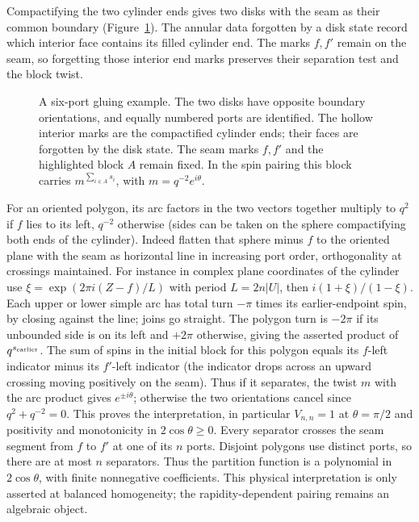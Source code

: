Compactifying the two cylinder ends gives two disks with the seam
as their common boundary (Figure~\ref{fig:disk-gluing}). The annular data
forgotten by a disk state record which interior face contains its filled
cylinder end. The marks \(f,f'\) remain on the seam, so forgetting those
interior end marks preserves their separation test and the block twist.
\begin{figure}[htbp]
\centering

\caption{A six-port gluing example. The two disks have opposite boundary
orientations, and equally numbered ports are identified. The hollow
interior marks are the compactified cylinder ends; their faces are
forgotten by the disk state. The seam marks $f,f'$ and the highlighted
block $A$ remain fixed. In the spin pairing this block carries
$m^{\sum_{i\in A}s_i}$, with $m=q^{-2}e^{i\theta}$.}
\label{fig:disk-gluing}
\end{figure}

For an oriented polygon, its arc factors in the two vectors together multiply to \(q^2\) if \(f\) lies to its left, \(q^{-2}\) otherwise (sides can be taken on the sphere compactifying both ends of the cylinder). Indeed flatten that sphere minus \(f\) to the oriented plane with the seam as horizontal line in increasing port order, orthogonality at crossings maintained. For instance in complex plane coordinates of the cylinder use \(\xi=\exp(2\pi i(Z-f)/L)\) with period \(L=2n|U|\), then \(i(1+\xi)/(1-\xi)\). Each upper or lower simple arc has total turn \(-\pi\) times its earlier-endpoint spin, by closing against the line; joins go straight. The polygon turn is \(-2\pi\) if its unbounded side is on its left and \(+2\pi\) otherwise, giving the asserted product of \(q^{s_{\rm earlier}}\). The sum of spins in the initial block for this polygon equals its \(f\)-left indicator minus its \(f'\)-left indicator (the indicator drops across an upward crossing moving positively on the seam). Thus if it separates, the twist \(m\) with the arc product gives \(e^{\pm i\theta}\); otherwise the two orientations cancel since \(q^2+q^{-2}=0\). This proves the interpretation, in particular \(V_{n,n}=1\) at
\(\theta=\pi/2\) and positivity and monotonicity in \(2\cos\theta\ge0\).
Every separator crosses the seam segment from \(f\) to \(f'\) at one
of its \(n\) ports. Disjoint polygons use distinct ports, so there are
at most \(n\) separators. Thus the partition function is a polynomial
in \(2\cos\theta\), with finite nonnegative coefficients. This
physical interpretation is only asserted at balanced homogeneity;
the rapidity-dependent pairing remains an algebraic object.

